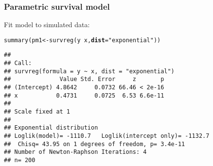 \documentclass[color=usenames,dvipsnames]{beamer}\usepackage[]{graphicx}\usepackage[]{xcolor}
\makeatletter
\newcommand{\hlsng}[1]{\textcolor[rgb]{0.749,0.012,0.012}{#1}}%
\newcommand{\hlopt}[1]{\textcolor[rgb]{0,0,0}{#1}}%
\newcommand{\hldef}[1]{\textcolor[rgb]{0,0,0}{#1}}%
\newcommand{\hlkwb}[1]{\textcolor[rgb]{0,0.341,0.682}{#1}}%
\newcommand{\hlkwc}[1]{\textcolor[rgb]{0,0,0}{\textbf{#1}}}%
\newcommand{\hlkwd}[1]{\textcolor[rgb]{0.004,0.004,0.506}{#1}}%
\newenvironment{kframe}{%
 \def\at@end@of@kframe{}%
 \ifinner\ifhmode%
  \def\at@end@of@kframe{\end{minipage}}%
  \begin{minipage}{\columnwidth}%
 \fi\fi%
 \def\FrameCommand##1{\hskip\@totalleftmargin \hskip-\fboxsep
 \colorbox{shadecolor}{##1}\hskip-\fboxsep
     \hskip-\linewidth \hskip-\@totalleftmargin \hskip\columnwidth}%
 \MakeFramed {\advance\hsize-\width
   \@totalleftmargin\z@ \linewidth\hsize
   \@setminipage}}%
 {\par\unskip\endMakeFramed%
 \at@end@of@kframe}
\newenvironment{knitrout}{}{} %
\makeatother
\begin{document}
\begin{frame}[fragile]
  \frametitle{Parametric survival model}
  Fit model to simulated data:
\begin{knitrout}\scriptsize
{}\color{fgcolor}\begin{kframe}
\begin{alltt}
\hlkwd{summary}\hldef{(pm1} \hlkwb{<-} \hlkwd{survreg}\hldef{(y} \hlopt{~} \hldef{x,} \hlkwc{dist}\hldef{=}\hlsng{"exponential"}\hldef{))}
\end{alltt}
\begin{verbatim}
## 
## Call:
## survreg(formula = y ~ x, dist = "exponential")
##              Value Std. Error     z       p
## (Intercept) 4.8642     0.0732 66.46 < 2e-16
## x           0.4731     0.0725  6.53 6.6e-11
## 
## Scale fixed at 1 
## 
## Exponential distribution
## Loglik(model)= -1110.7   Loglik(intercept only)= -1132.7
## 	Chisq= 43.95 on 1 degrees of freedom, p= 3.4e-11 
## Number of Newton-Raphson Iterations: 4 
## n= 200
\end{verbatim}
\end{kframe}
\end{knitrout}
\end{frame}
\end{document}

